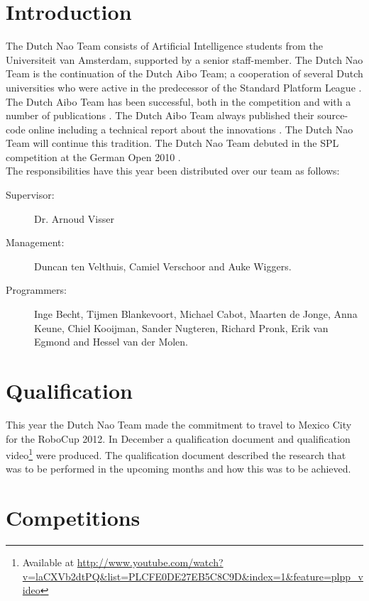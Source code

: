\documentclass[a4paper]{article}
\begin{document}
\section{Introduction}
The Dutch Nao Team consists of Artificial Intelligence students from the Universiteit van Amsterdam, supported by a senior staff-member. The Dutch Nao Team is the continuation of the Dutch Aibo Team; a cooperation of several Dutch universities who were active in the predecessor of the Standard Platform League \cite{AIBOTeam2006, AIBOTeam2005, AIBOTeam2004}. The Dutch Aibo Team has been successful, both in the competition and with a number of publications \cite{ArnoudJurgen2009, RoboticDog2008, Panoramic2007, ColorLearning2006, Localization2006, Perception2005}.
The Dutch Aibo Team always published their source-code online including a technical report about the innovations \cite{Visser2006}.
The Dutch Nao Team will continue this tradition. The Dutch Nao Team debuted in the SPL competition at the German Open 2010 \cite{DutchNaoTeamTDP2010}.\\

\noindent The responsibilities have this year been distributed over our team as follows:
\begin{description}
\item[Supervisor:] Dr. Arnoud Visser %
\item[Management:] Duncan ten Velthuis, Camiel Verschoor and Auke Wiggers.
\item[Programmers:] Inge Becht, Tijmen Blankevoort, Michael Cabot, Maarten de Jonge, Anna Keune, Chiel Kooijman, Sander Nugteren, Richard Pronk, Erik van Egmond and Hessel van der Molen.
\end{description}

\section{Qualification}
This year the Dutch Nao Team made the commitment to travel to Mexico City for the RoboCup 2012. In December a qualification document \cite{DutchNaoTeamQualification} and qualification video\footnote{Available at \url{http://www.youtube.com/watch?v=laCXVb2dtPQ&list=PLCFE0DE27EB5C8C9D&index=1&feature=plpp_video}} were produced. The qualification document described the research that was to be performed in the upcoming months and how this was to be achieved.

\section{Competitions}
\end{document}
